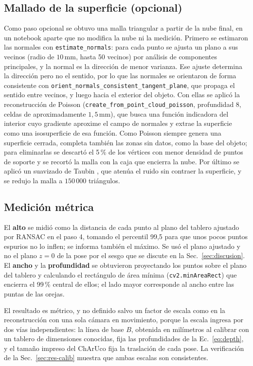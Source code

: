 \documentclass[10pt,a4paper,twocolumn]{article}
\newcommand{\mm}{\,\mathrm{mm}}
\newcommand{\code}[1]{\texttt{#1}}
\begin{document}
\subsection{Mallado de la superficie (opcional)}
\label{sec:met-poisson}

Como paso opcional se obtuvo una malla triangular a partir de la nube final, en un notebook aparte que no modifica la nube ni la medición. Primero se estimaron las normales con \code{estimate\_normals}: para cada punto se ajusta un plano a sus vecinos (radio de $10\mm$, hasta 50 vecinos) por análisis de componentes principales, y la normal es la dirección de menor varianza. Ese ajuste determina la dirección pero no el sentido, por lo que las normales se orientaron de forma consistente con \code{orient\_normals\_consistent\_tangent\_plane}, que propaga el sentido entre vecinos, y luego hacia el exterior del objeto. Con ellas se aplicó la reconstrucción de Poisson \cite{poisson} (\code{create\_from\_point\_cloud\_poisson}, profundidad 8, celdas de aproximadamente $1{,}5\mm$), que busca una función indicadora del interior cuyo gradiente aproxime el campo de normales y extrae la superficie como una isosuperficie de esa función. Como Poisson siempre genera una superficie cerrada, completa también las zonas sin datos, como la base del objeto; para eliminarlas se descartó el 5\,\% de los vértices con menor densidad de puntos de soporte y se recortó la malla con la caja que encierra la nube. Por último se aplicó un suavizado de Taubin \cite{taubin}, que atenúa el ruido sin contraer la superficie, y se redujo la malla a $150\,000$ triángulos.

\subsection{Medición métrica}
\label{sec:met-medicion}

El \textbf{alto} se midió como la distancia de cada punto al plano del tablero ajustado por RANSAC en el paso 4, tomando el percentil 99,5 para que unos pocos puntos espurios no lo inflen; se informa también el máximo. Se usó el plano ajustado y no el plano $z=0$ de la pose por el sesgo que se discute en la Sec.~\ref{sec:discusion}. El \textbf{ancho} y la \textbf{profundidad} se obtuvieron proyectando los puntos sobre el plano del tablero y calculando el rectángulo de área mínima (\code{cv2.minAreaRect}) que encierra el 99\,\% central de ellos; el lado mayor corresponde al ancho entre las puntas de las orejas.

El resultado es métrico, y no definido salvo un factor de escala como en la reconstrucción con una sola cámara en movimiento, porque la escala ingresa por dos vías independientes: la línea de base $B$, obtenida en milímetros al calibrar con un tablero de dimensiones conocidas, fija las profundidades de la Ec.~\eqref{eq:depth}, y el tamaño impreso del ChArUco fija la traslación de cada pose. La verificación de la Sec.~\ref{sec:res-calib} muestra que ambas escalas son consistentes.
\end{document}
